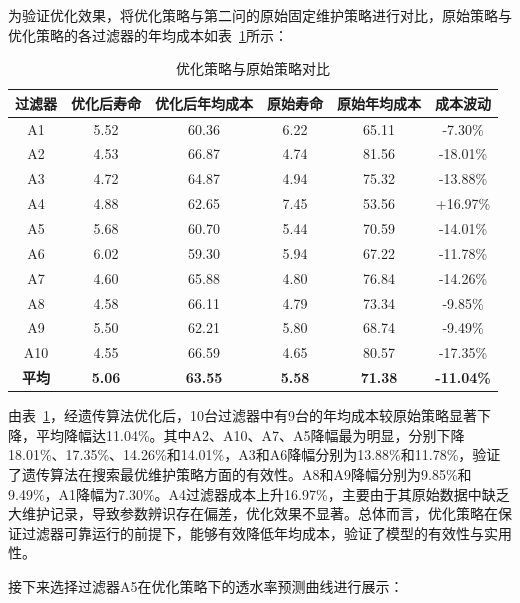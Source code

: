 \documentclass[withoutpreface,bwprint]{cumcmthesis}
\begin{document}
为验证优化效果，将优化策略与第二问的原始固定维护策略进行对比，原始策略与优化策略的各过滤器的年均成本如表~\ref{tab:新旧对比}所示：

\begin{table}[H]
	\centering
	\setlength{\tabcolsep}{6pt}
	\renewcommand{\arraystretch}{1.2}
	\caption{优化策略与原始策略对比}
	\label{tab:新旧对比}
	\begin{tabular}{cccccc}
		\toprule
		\textbf{过滤器} & \textbf{优化后寿命} & \textbf{优化后年均成本} & \textbf{原始寿命} & \textbf{原始年均成本} & \textbf{成本波动} \\
		\midrule
		\rowcolor{LightBlue}
		A1 & 5.52 & 60.36 & 6.22 & 65.11 & -7.30\% \\
		A2 & 4.53 & 66.87 & 4.74 & 81.56 & -18.01\% \\
		\rowcolor{LightBlue}
		A3 & 4.72 & 64.87 & 4.94 & 75.32 & -13.88\% \\
		A4 & 4.88 & 62.65 & 7.45 & 53.56 & +16.97\% \\
		\rowcolor{LightBlue}
		A5 & 5.68 & 60.70 & 5.44 & 70.59 & -14.01\% \\
		A6 & 6.02 & 59.30 & 5.94 & 67.22 & -11.78\% \\
		\rowcolor{LightBlue}
		A7 & 4.60 & 65.88 & 4.80 & 76.84 & -14.26\% \\
		A8 & 4.58 & 66.11 & 4.79 & 73.34 & -9.85\% \\
		\rowcolor{LightBlue}
		A9 & 5.50 & 62.21 & 5.80 & 68.74 & -9.49\% \\
		A10 & 4.55 & 66.59 & 4.65 & 80.57 & -17.35\% \\
		\midrule
		\rowcolor{LightBlue}
		\textbf{平均} & \textbf{5.06} & \textbf{63.55} & \textbf{5.58} & \textbf{71.38} & \textbf{-11.04\%} \\
		\bottomrule
	\end{tabular}
\end{table}

由表~\ref{tab:新旧对比}，经遗传算法优化后，10台过滤器中有9台的年均成本较原始策略显著下降，平均降幅达11.04\%。其中A2、A10、A7、A5降幅最为明显，分别下降18.01\%、17.35\%、14.26\%和14.01\%，A3和A6降幅分别为13.88\%和11.78\%，验证了遗传算法在搜索最优维护策略方面的有效性。A8和A9降幅分别为9.85\%和9.49\%，A1降幅为7.30\%。A4过滤器成本上升16.97\%，主要由于其原始数据中缺乏大维护记录，导致参数辨识存在偏差，优化效果不显著。总体而言，优化策略在保证过滤器可靠运行的前提下，能够有效降低年均成本，验证了模型的有效性与实用性。

接下来选择过滤器A5在优化策略下的透水率预测曲线进行展示：
\end{document}
